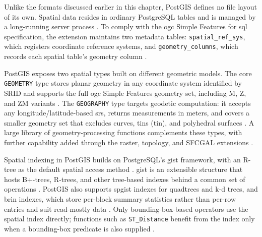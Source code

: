 Unlike the formats discussed earlier in this chapter, PostGIS defines no file layout of its own. Spatial data resides in ordinary PostgreSQL tables \parencite{postgis2024_manual_34} and is managed by a long-running server process \parencite{postgresql2024_architectural_fundamentals}. To comply with the \acrshort{ogc} Simple Features for \acrshort{sql} specification, the extension maintains two metadata tables: \texttt{spatial\_ref\_sys}, which registers coordinate reference systems, and \texttt{geometry\_columns}, which records each spatial table's geometry column \parencite{postgis2024_manual_34}.

PostGIS exposes two spatial types built on different geometric models. The core \texttt{GEOMETRY} type stores planar geometry in any coordinate system identified by SRID and supports the full \acrshort{ogc} Simple Features geometry set, including M, Z, and ZM variants \parencite{postgis2024_manual_34}. The \texttt{GEOGRAPHY} type targets geodetic computation: it accepts any longitude/latitude-based \acrshort{srs}, returns measurements in meters, and covers a smaller geometry set that excludes curves, \acrlong{tin}s (\acrshort{tin}), and polyhedral surfaces \parencite{postgis2024_manual_34}. A large library of geometry-processing functions complements these types, with further capability added through the raster, topology, and SFCGAL extensions \parencite{postgis2024_manual_34}.

Spatial indexing in PostGIS builds on PostgreSQL's \acrshort{gist} framework, with an R-tree as the default spatial access method \parencite{postgis2024_manual_34, hellerstein1995_generalized_search_trees_database_systems}. \acrshort{gist} is an extensible structure that hosts B+-trees, R-trees, and other tree-based indexes behind a common set of operations \parencite{hellerstein1995_generalized_search_trees_database_systems}. PostGIS also supports \acrfull{spgist} indexes for quadtrees and k-d trees, and \acrfull{brin} indexes, which store per-block summary statistics rather than per-row entries and suit read-mostly data \parencite{postgis2024_manual_34}. Only bounding-box-based operators use the spatial index directly; functions such as \texttt{ST\_Distance} benefit from the index only when a bounding-box predicate is also supplied \parencite{postgis2024_manual_34}.

